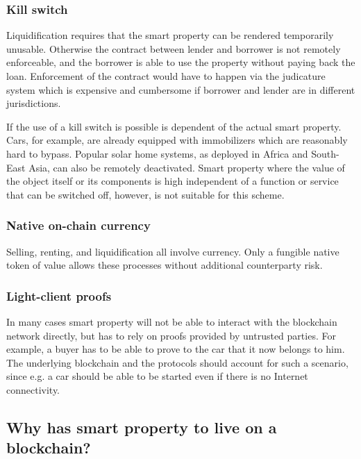 \subsubsection{Kill switch}

Liquidification requires that the smart property can be rendered temporarily unusable. Otherwise the contract between lender and borrower is not remotely enforceable, and the borrower is able to use the property without paying back the loan. Enforcement of the contract would have to happen via the judicature system which is expensive and cumbersome if borrower and lender are in different jurisdictions. 

If the use of a kill switch is possible is dependent of the actual smart property. Cars, for example, are already equipped with immobilizers which are reasonably hard to bypass. Popular solar home systems, as deployed in Africa and South-East Asia, can also be remotely deactivated. Smart property where the value of the object itself or its components is high independent of a function or service that can be switched off, however, is not suitable for this scheme. 

\subsubsection{Native on-chain currency}
Selling, renting, and liquidification all involve currency. Only a fungible native token of value allows these processes without additional counterparty risk. 

\subsubsection{Light-client proofs}

In many cases smart property will not be able to interact with the blockchain network directly, but has to rely on proofs provided by untrusted parties. For example, a buyer has to be able to prove to the car that it now belongs to him. The underlying blockchain and the protocols should account for such a scenario, since e.g. a car should be able to be started even if there is no Internet connectivity.



\subsection{Why has smart property to live on a blockchain?}

